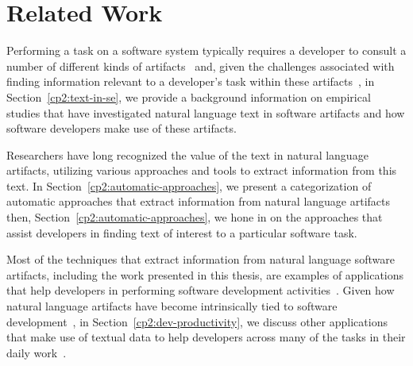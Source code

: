 \setcounter{chapter}{1}


\chapter{Related Work}
\label{ch:related-work}







Performing a task on a software system typically requires a developer to consult
a number of different kinds of artifacts~\cite{umarji2008archetypal,Li2013}
and, given the challenges associated with finding
information relevant to a developer's task
within these artifacts~\cite{Starke2009,DeGraaf2014},
in Section~\ref{cp2:text-in-se}, we provide a background information on empirical studies that 
have 
investigated 
natural language text in software artifacts
and how software developers make use of these artifacts.







Researchers have long recognized the value of the text in natural language
artifacts, utilizing various approaches and tools 
to extract information from this text. 
In Section~\ref{cp2:automatic-approaches}, 
we present a categorization of 
 automatic approaches that
extract information from natural language artifacts
then, Section~\ref{cp2:automatic-approaches}, 
we
hone in on the approaches that
assist developers in finding text of interest 
to a particular software task.






Most of the techniques that extract information from natural language software artifacts, including the work presented in this thesis, 
are examples of applications that help developers in performing 
software development activities~\cite{Meyer2017}. 
Given how 
natural language artifacts have become intrinsically
tied to software development~\cite{liu2021, watson2022, umarji2008archetypal},
in Section~\ref{cp2:dev-productivity}, 
we discuss
other applications that make use of textual data
to help developers
across many of the tasks in their daily work~\cite{Treude2016,  robillard2017, silva2019}.




% 
% 





